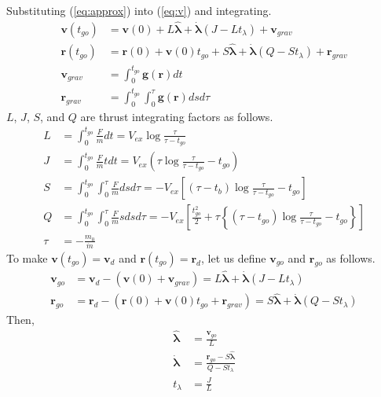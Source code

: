\documentclass{fdclreport}
\begin{document}
Substituting (\ref{eq:approx}) into (\ref{eq:v}) and integrating.
\begin{align}
	\bm{v}(t_{go}) &= \bm{v}(0) + L\bm{\hat{\lambda}} + \bm{\dot{\lambda}}(J - L t_{\lambda}) + \bm{v}_{grav} \\
	\bm{r}(t_{go}) &= \bm{r}(0) + \bm{v}(0)t_{go} + S \bm{\hat{\lambda}} + \bm{\dot{\lambda}}(Q - S t_{\lambda}) + \bm{r}_{grav} \\
	\bm{v}_{grav} &= \int_{0}^{t_{go}}\bm{g}(\bm{r}) dt \\
	\bm{r}_{grav} &= \int_{0}^{t_{go}} \int_{0}^{\tau} \bm{g}(\bm{r}) dsd\tau
\end{align}
$L$, $J$, $S$, and $Q$ are thrust integrating factors as follows.
\begin{align}
	L &= \int_{0}^{t_{go}} \frac{F}{m}dt = V_{ex} \log \frac{\tau}{\tau-t_{go}} \\
	J &= \int_{0}^{t_{go}} \frac{F}{m}t dt = V_{ex} \left( \tau \log \frac{\tau}{\tau - t_{go}} - t_{go} \right) \\
	S &= \int_{0}^{t_{go}} \int_{0}^{\tau} \frac{F}{m}dsd\tau = -V_{ex} \left[ \left(\tau - t_b \right) \log \frac{\tau}{\tau-t_{go}} - t_{go} \right] \\
	Q &= \int_{0}^{t_{go}} \int_{0}^{\tau} \frac{F}{m}sdsd\tau = -V_{ex} \left[ \frac{t_{go}^2}{2} + \tau \left\{ \left(\tau - t_{go}\right) \log \frac{\tau}{\tau - t_{go}} - t_{go} \right\} \right] \\
	\tau &= -\frac{m_0}{\dot{m}}
\end{align}
To make $\bm{v}(t_{go}) = \bm{v}_{d}$ and $\bm{r}(t_{go}) = \bm{r}_{d}$, let us define $\bm{v}_{go}$ and $\bm{r}_{go}$ as follows.
\begin{align}
	\bm{v}_{go} &= \bm{v}_{d} - (\bm{v}(0) + \bm{v}_{grav}) = L\bm{\hat{\lambda}} + \bm{\dot{\lambda}}(J - L t_{\lambda}) \\
	\bm{r}_{go} &= \bm{r}_{d} - (\bm{r}(0) + \bm{v}(0)t_{go} + \bm{r}_{grav}) = S \bm{\hat{\lambda}} + \bm{\dot{\lambda}}(Q - S t_{\lambda})
\end{align}
Then,
\begin{align}
	\bm{\hat{\lambda}} &= \frac{\bm{v}_{go}}{L} \\
	\bm{\dot{\lambda}} &= \frac{\bm{r}_{go} - S \bm{\hat{\lambda}}} {Q - S t_{\lambda}} \\
	t_{\lambda} &= \frac{J}{L}
\end{align}
\end{document}
